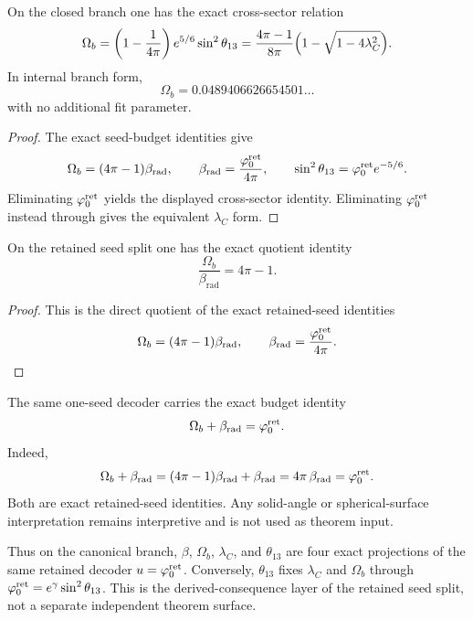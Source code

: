 \begin{corollary}
\label{cor:baryon-reactor-bridge-law}
On the closed branch one has the exact cross-sector relation
\[
\Omega_b
=
\left(1-\frac{1}{4\pi}\right)e^{5/6}\sin^2\theta_{13}
=
\frac{4\pi-1}{8\pi}\Bigl(1-\sqrt{1-4\lambda_C^2}\Bigr).
\]
In internal branch form,
\[
\Omega_b=0.0489406626654501\ldots
\]
with no additional fit parameter.
\end{corollary}

\begin{proof}
The exact seed-budget identities give
\[
\Omega_b=(4\pi-1)\beta_{\mathrm{rad}},
\qquad
\beta_{\mathrm{rad}}=\frac{\varphi_0^{\mathrm{ret}}}{4\pi},
\qquad
\sin^2\theta_{13}=\varphi_0^{\mathrm{ret}} e^{-5/6}.
\]
Eliminating $\varphi_0^{\mathrm{ret}}$ yields the displayed cross-sector identity. Eliminating $\varphi_0^{\mathrm{ret}}$ instead through
 gives the equivalent $\lambda_C$ form.
\end{proof}

\begin{corollary}
\label{cor:matter-radiation-quotient}
On the retained seed split one has the exact quotient identity
\[
\frac{\Omega_b}{\beta_{\mathrm{rad}}}=4\pi-1.
\]
\end{corollary}

\begin{proof}
This is the direct quotient of the exact retained-seed identities
\[
\Omega_b=(4\pi-1)\beta_{\mathrm{rad}},
\qquad
\beta_{\mathrm{rad}}=\frac{\varphi_0^{\mathrm{ret}}}{4\pi}.
\]
\end{proof}

\begin{remark}
The same one-seed decoder carries the exact budget identity
\begin{equation}
\label{eq:seed-budget-identity}
\Omega_b+\beta_{\mathrm{rad}}=\varphi_0^{\mathrm{ret}}.
\end{equation}
Indeed,
\[
\Omega_b+\beta_{\mathrm{rad}}
=(4\pi-1)\beta_{\mathrm{rad}}+\beta_{\mathrm{rad}}
=4\pi\,\beta_{\mathrm{rad}}
=\varphi_0^{\mathrm{ret}}.
\]
Both  are exact retained-seed
identities. Any solid-angle or spherical-surface interpretation remains interpretive and is not
used as theorem input.
\end{remark}

Thus on the canonical branch, $\beta$, $\Omega_b$, $\lambda_C$, and $\theta_{13}$ are four exact
projections of the same retained decoder $u=\varphi_0^{\mathrm{ret}}$. Conversely, $\theta_{13}$ fixes $\lambda_C$ and
$\Omega_b$ through $\varphi_0^{\mathrm{ret}}=e^\gamma\sin^2\theta_{13}$. This is the derived-consequence layer of the
retained seed split, not a separate independent theorem surface.

